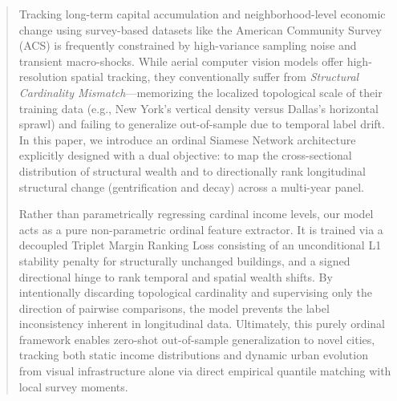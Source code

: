 \begin{abstract}
Tracking long-term capital accumulation and neighborhood-level economic change using survey-based datasets like the American Community Survey (ACS) is frequently constrained by high-variance sampling noise and transient macro-shocks. While aerial computer vision models offer high-resolution spatial tracking, they conventionally suffer from \textit{Structural Cardinality Mismatch}---memorizing the localized topological scale of their training data (e.g., New York's vertical density versus Dallas's horizontal sprawl) and failing to generalize out-of-sample due to temporal label drift. In this paper, we introduce an ordinal Siamese Network architecture explicitly designed with a dual objective: to map the cross-sectional distribution of structural wealth and to directionally rank longitudinal structural change (gentrification and decay) across a multi-year panel. 

Rather than parametrically regressing cardinal income levels, our model acts as a pure non-parametric ordinal feature extractor. It is trained via a decoupled Triplet Margin Ranking Loss consisting of an unconditional L1 stability penalty for structurally unchanged buildings, and a signed directional hinge to rank temporal and spatial wealth shifts. By intentionally discarding topological cardinality and supervising only the direction of pairwise comparisons, the model prevents the label inconsistency inherent in longitudinal data. Ultimately, this purely ordinal framework enables zero-shot out-of-sample generalization to novel cities, tracking both static income distributions and dynamic urban evolution from visual infrastructure alone via direct empirical quantile matching with local survey moments.
\end{abstract}